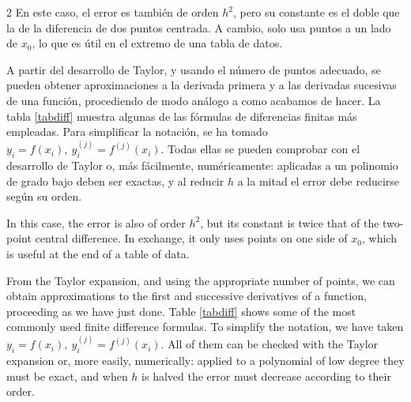 \begin{paracol}{2}
En este caso, el error es también de orden $h^2$, pero su constante es el doble que la de la diferencia de dos puntos centrada. A cambio, solo usa puntos a un lado de $x_0$, lo que es útil en el extremo de una tabla de datos.

A partir del desarrollo de Taylor, y usando el número de puntos adecuado, se pueden obtener aproximaciones a la derivada primera y a las derivadas sucesivas de una función, procediendo de modo análogo a como acabamos de hacer. La tabla \ref{tabdiff} muestra algunas de las fórmulas de diferencias finitas más empleadas. Para simplificar la notación, se ha tomado $y_i=f(x_i), \ y_i^{(j)}=f^{(j)}(x_i)$. Todas ellas se pueden comprobar con el desarrollo de Taylor o, más fácilmente, numéricamente: aplicadas a un polinomio de grado bajo deben ser exactas, y al reducir $h$ a la mitad el error debe reducirse según su orden.

\switchcolumn
In this case, the error is also of order $h^2$, but its constant is twice that of the two-point central difference. In exchange, it only uses points on one side of $x_0$, which is useful at the end of a table of data.

From the Taylor expansion, and using the appropriate number of points, we can obtain approximations to the first and successive derivatives of a function, proceeding as we have just done. Table \ref{tabdiff} shows some of the most commonly used finite difference formulas. To simplify the notation, we have taken $y_i=f(x_i), \ y_i^{(j)}=f^{(j)}(x_i)$. All of them can be checked with the Taylor expansion or, more easily, numerically: applied to a polynomial of low degree they must be exact, and when $h$ is halved the error must decrease according to their order.
\end{paracol}

